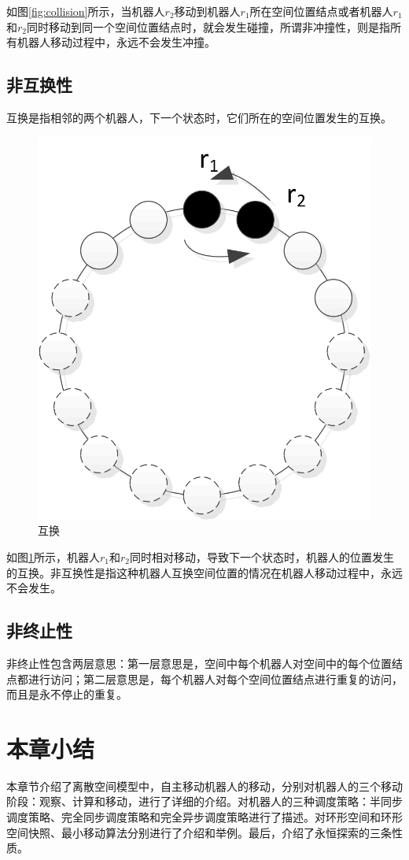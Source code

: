 如图\ref{fig:collision}所示，当机器人$r_2$移动到机器人$r_1$所在空间位置结点或者机器人$r_1$和$r_2$同时移动到同一个空间位置结点时，就会发生碰撞，所谓非冲撞性，则是指所有机器人移动过程中，永远不会发生冲撞。

\subsection{非互换性}
互换是指相邻的两个机器人，下一个状态时，它们所在的空间位置发生的互换。

\begin{figure}[!hbt]
	\centering
	\includegraphics[width=2.5 in]{fig/switch.png}
	\caption{互换}
	\label{fig:switch}
\end{figure}

如图\ref{fig:switch}所示，机器人$r_1$和$r_2$同时相对移动，导致下一个状态时，机器人的位置发生的互换。非互换性是指这种机器人互换空间位置的情况在机器人移动过程中，永远不会发生。

\subsection{非终止性}
非终止性包含两层意思：第一层意思是，空间中每个机器人对空间中的每个位置结点都进行访问；第二层意思是，每个机器人对每个空间位置结点进行重复的访问，而且是永不停止的重复。

\section{本章小结}
本章节介绍了离散空间模型中，自主移动机器人的移动，分别对机器人的三个移动阶段：观察、计算和移动，进行了详细的介绍。对机器人的三种调度策略：半同步调度策略、完全同步调度策略和完全异步调度策略进行了描述。对环形空间和环形空间快照、最小移动算法分别进行了介绍和举例。最后，介绍了永恒探索的三条性质。
